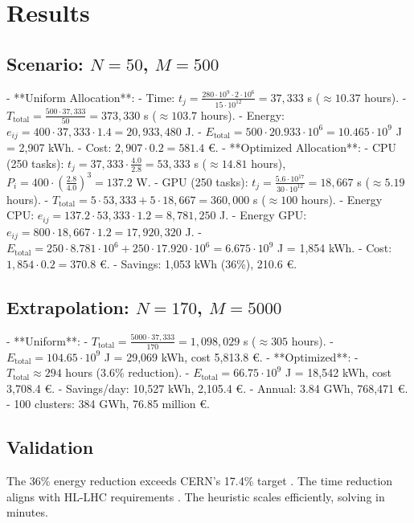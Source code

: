 \documentclass[a4paper,11pt]{article}
\begin{document}
\section{Results}

\subsection{Scenario: \texorpdfstring{$N=50$, $M=500$}{N=50, M=500}}
- **Uniform Allocation**:
  - Time: $t_j = \frac{280 \cdot 10^9 \cdot 2 \cdot 10^6}{15 \cdot 10^{12}} = 37,333$ s ($\approx 10.37$ hours).
  - $T_{\text{total}} = \frac{500 \cdot 37,333}{50} = 373,330$ s ($\approx 103.7$ hours).
  - Energy: $e_{ij} = 400 \cdot 37,333 \cdot 1.4 = 20,933,480$ J.
  - $E_{\text{total}} = 500 \cdot 20.933 \cdot 10^6 = 10.465 \cdot 10^9$ J = 2,907 kWh.
  - Cost: $2,907 \cdot 0.2 = 581.4$ €.
- **Optimized Allocation**:
  - CPU (250 tasks): $t_j = 37,333 \cdot \frac{4.0}{2.8} = 53,333$ s ($\approx 14.81$ hours), $P_i = 400 \cdot \left( \frac{2.8}{4.0} \right)^3 = 137.2$ W.
  - GPU (250 tasks): $t_j = \frac{5.6 \cdot 10^{17}}{30 \cdot 10^{12}} = 18,667$ s ($\approx 5.19$ hours).
  - $T_{\text{total}} = 5 \cdot 53,333 + 5 \cdot 18,667 = 360,000$ s ($\approx 100$ hours).
  - Energy CPU: $e_{ij} = 137.2 \cdot 53,333 \cdot 1.2 = 8,781,250$ J.
  - Energy GPU: $e_{ij} = 800 \cdot 18,667 \cdot 1.2 = 17,920,320$ J.
  - $E_{\text{total}} = 250 \cdot 8.781 \cdot 10^6 + 250 \cdot 17.920 \cdot 10^6 = 6.675 \cdot 10^9$ J = 1,854 kWh.
  - Cost: $1,854 \cdot 0.2 = 370.8$ €.
  - Savings: 1,053 kWh (36\%), 210.6 €.

\subsection{Extrapolation: \texorpdfstring{$N=170$, $M=5000$}{N=170, M=5000}}
- **Uniform**:
  - $T_{\text{total}} = \frac{5000 \cdot 37,333}{170} = 1,098,029$ s ($\approx 305$ hours).
  - $E_{\text{total}} = 104.65 \cdot 10^9$ J = 29,069 kWh, cost 5,813.8 €.
- **Optimized**:
  - $T_{\text{total}} \approx 294$ hours (3.6\% reduction).
  - $E_{\text{total}} = 66.75 \cdot 10^9$ J = 18,542 kWh, cost 3,708.4 €.
  - Savings/day: 10,527 kWh, 2,105.4 €.
  - Annual: 3.84 GWh, 768,471 €.
  - 100 clusters: 384 GWh, 76.85 million €.

\subsection{Validation}
The 36\% energy reduction exceeds CERN’s 17.4\% target \cite{CERNABB2025}. The time reduction aligns with HL-LHC requirements \cite{HL-LHC2025}. The heuristic scales efficiently, solving in minutes.
\end{document}
